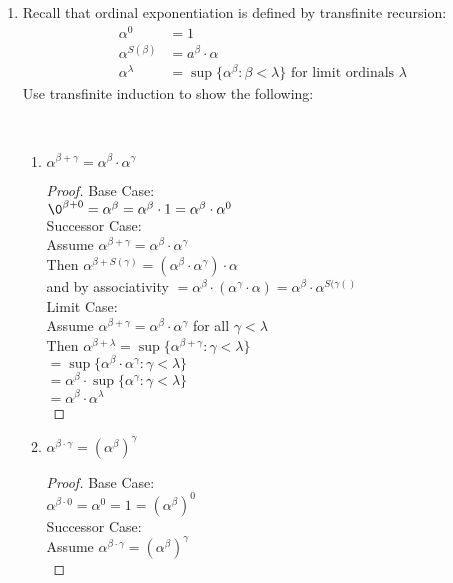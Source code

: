 \documentclass[11pt]{amsart}
\begin{document}
\begin{enumerate}
\newpage

\item Recall that ordinal exponentiation is defined by transfinite recursion:
\begin{align*}
\alpha^0 &=1 \\
\alpha^{S(\beta)} &= a^{\beta} \cdot \alpha \\
\alpha^{\lambda} &= \sup \{ \alpha^{\beta} : \beta < \lambda\} \text{ for limit ordinals $\lambda$}  
\end{align*}
Use transfinite induction to show the following:

\ 
\begin{enumerate}
\item $\alpha^{\beta+\gamma} = \alpha^{\beta} \cdot \alpha^{\gamma}$

\begin{proof}
Base Case:\\
$\0^{\beta+0}=\alpha^{\beta}=\alpha^{\beta} \cdot 1 = \alpha^\beta \cdot \alpha^0$\\
Successor Case:\\
Assume $\alpha^{\beta+\gamma}=\alpha^{\beta} \cdot \alpha^{\gamma}$\\
Then $\alpha^{\beta+S(\gamma)}=(\alpha^{\beta} \cdot \alpha^{\gamma}) \cdot \alpha$ \\
and by associativity $= \alpha^{\beta} \cdot (\alpha^{\gamma} \cdot \alpha) = \alpha^\beta \cdot \alpha^{S(\gamma()}$\\
Limit Case:\\
Assume $\alpha^{\beta+\gamma}=\alpha^{\beta} \cdot \alpha^{\gamma}$ for all $\gamma < \lambda$\\
Then $\alpha^{\beta+\lambda}=\sup \{ \alpha^{\beta+\gamma} : \gamma < \lambda\}$\\
$=\sup \{ \alpha^{\beta} \cdot \alpha^{\gamma} : \gamma < \lambda\}$\\
$=\alpha^{\beta} \cdot \sup \{ \alpha^{\gamma} : \gamma < \lambda\}$\\
$=\alpha^{\beta} \cdot \alpha^{\lambda}$\\
\end{proof}
\vfill
\item $\alpha^{\beta \cdot \gamma} = \left(\alpha^{\beta}\right)^{\gamma}$
\begin{proof}
 Base Case:\\
$\alpha^{\beta \cdot 0}=\alpha^0=1=(\alpha^\beta)^0$\\
Successor Case:\\
Assume $\alpha^{\beta \cdot \gamma}=(\alpha^\beta)^\gamma$\\

\end{proof}
\end{enumerate}
\end{enumerate}
\end{document}
